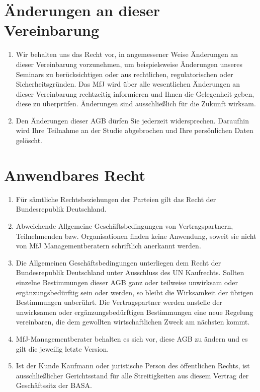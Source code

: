 \documentclass[a4paper, 12pt]{scrartcl}
\begin{document}
    \section{\"Anderungen an dieser Vereinbarung}
    \begin{enumerate}
        \item Wir behalten uns das Recht vor, in angemessener Weise \"Anderungen an dieser Vereinbarung vorzunehmen, um beispielsweise \"Anderungen unseres Seminars zu ber\"ucksichtigen oder aus rechtlichen, regulatorischen oder Sicherheitsgr\"unden.
        Das MfJ wird \"uber alle wesentlichen \"Anderungen an dieser Vereinbarung rechtzeitig informieren und Ihnen die Gelegenheit geben, diese zu \"uberpr\"ufen.
        \"Anderungen sind ausschließlich f\"ur die Zukunft wirksam.
        \item Den \"Anderungen dieser AGB d\"urfen Sie jederzeit widersprechen. Daraufhin wird Ihre Teilnahme an der Studie abgebrochen und Ihre pers\"onlichen Daten gel\"oscht.
    \end{enumerate}

    \section{Anwendbares Recht}
    \begin{enumerate}
        \item F\"ur s\"amtliche Rechtsbeziehungen der Parteien gilt das Recht der Bundesrepublik Deutschland.

        \item Abweichende Allgemeine Gesch\"aftsbedingungen von Vertragspartnern, Teilnehmenden bzw. Organisationen finden keine Anwendung, soweit sie nicht von MfJ Managementberatern schriftlich anerkannt werden.

        \item Die Allgemeinen Gesch\"aftsbedingungen unterliegen dem Recht der Bundesrepublik Deutschland unter Ausschluss des UN Kaufrechts.
        Sollten einzelne Bestimmungen dieser AGB ganz oder teilweise unwirksam oder erg\"anzungsbed\"urftig sein oder werden, so bleibt die Wirksamkeit der \"ubrigen Bestimmungen unber\"uhrt.
        Die Vertragspartner werden anstelle der unwirksamen oder erg\"anzungsbed\"urftigen Bestimmungen eine neue Regelung vereinbaren, die dem gewollten wirtschaftlichen Zweck am n\"achsten kommt.

        \item MfJ-Managementberater behalten es sich vor, diese AGB zu \"andern und es gilt die jeweilig letzte Version.

        \item Ist der Kunde Kaufmann oder juristische Person des \"offentlichen Rechts, ist ausschließlicher Gerichtsstand f\"ur alle Streitigkeiten aus diesem Vertrag der Gesch\"aftssitz der BASA.
    \end{enumerate}
\end{document}
